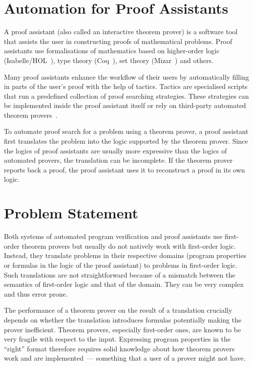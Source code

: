 \section[Automation for Proof Assistants]{Automation for Proof Assistants}\label{sect:intro:itp}
A proof assistant (also called an interactive theorem prover) is a software tool that assists the user in constructing proofs of mathematical problems. Proof assistants use formalisations of mathematics based on higher-order logic (Isabelle/HOL~\cite{Isabelle}), type theory (Coq~\cite{Coq}), set theory (Mizar~\cite{Mizar}) and others.

Many proof assistants enhance the workflow of their users by automatically filling in parts of the user's proof with the help of tactics. Tactics are specialised scripts that run a predefined collection of proof searching strategies. These strategies can be implemented inside the proof assistant itself or rely on third-party automated theorem provers~\cite{Sledgehammer,DBLP:conf/icms/UrbanHV10}.

To automate proof search for a problem using a theorem prover, a proof assistant first translates the problem into the logic supported by the theorem prover. Since the logics of proof assistants are usually more expressive than the logics of automated provers, the translation can be incomplete. If the theorem prover reports back a proof, the proof assistant uses it to reconstruct a proof in its own logic.


\section{Problem Statement}\label{sect:intro:problem}
Both systems of automated program verification and proof assistants use first-order theorem provers but usually do not natively work with first-order logic. Instead, they translate problems in their respective domains (program properties or formulas in the logic of the proof assistant) to problems in first-order logic. Such translations are not straightforward because of a mismatch between the semantics of first-order logic and that of the domain. They can be very complex and thus error prone.

The performance of a theorem prover on the result of a translation crucially depends on whether the translation introduces formulas potentially making the prover inefficient. Theorem provers, especially first-order ones, are known to be very fragile with respect to the input. Expressing program properties in the ``right'' format therefore requires solid knowledge about how theorem provers work and are implemented~--- something that a user of a prover might not have. 

